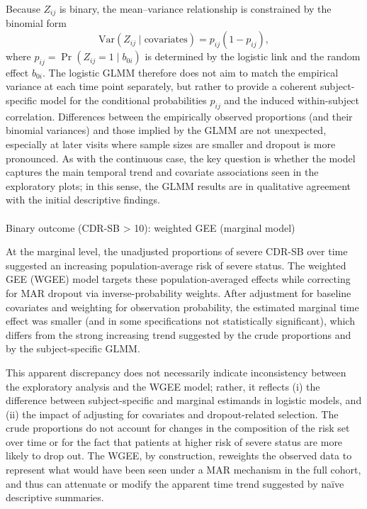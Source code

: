 \documentclass[
  9pt,
  letterpaper,
  DIV=11,
  numbers=noendperiod]{scrartcl}
\makeatletter
\let\oldparagraph\paragraph
\renewcommand{\paragraph}{
    \@ifstar
      \xxxParagraphStar
      \xxxParagraphNoStar
  }
\newcommand{\xxxParagraphStar}[1]{\oldparagraph*{#1}\mbox{}}
\newcommand{\xxxParagraphNoStar}[1]{\oldparagraph{#1}\mbox{}}
\makeatother
\begin{document}
Because \(Z_{ij}\) is binary, the mean--variance relationship is
constrained by the binomial form \[
\mathrm{Var}(Z_{ij} \mid \text{covariates}) = p_{ij}(1-p_{ij}),
\] where \(p_{ij}=\Pr(Z_{ij}=1\mid b_{0i})\) is determined by the
logistic link and the random effect \(b_{0i}\). The logistic GLMM
therefore does not aim to match the empirical variance at each time
point separately, but rather to provide a coherent subject-specific
model for the conditional probabilities \(p_{ij}\) and the induced
within-subject correlation. Differences between the empirically observed
proportions (and their binomial variances) and those implied by the GLMM
are not unexpected, especially at later visits where sample sizes are
smaller and dropout is more pronounced. As with the continuous case, the
key question is whether the model captures the main temporal trend and
covariate associations seen in the exploratory plots; in this sense, the
GLMM results are in qualitative agreement with the initial descriptive
findings.

\paragraph{Binary outcome (CDR-SB \textgreater{} 10): weighted GEE
(marginal
model)}\label{binary-outcome-cdr-sb-10-weighted-gee-marginal-model}

At the marginal level, the unadjusted proportions of severe CDR-SB over
time suggested an increasing population-average risk of severe status.
The weighted GEE (WGEE) model targets these population-averaged effects
while correcting for MAR dropout via inverse-probability weights. After
adjustment for baseline covariates and weighting for observation
probability, the estimated marginal time effect was smaller (and in some
specifications not statistically significant), which differs from the
strong increasing trend suggested by the crude proportions and by the
subject-specific GLMM.

This apparent discrepancy does not necessarily indicate inconsistency
between the exploratory analysis and the WGEE model; rather, it reflects
(i) the difference between subject-specific and marginal estimands in
logistic models, and (ii) the impact of adjusting for covariates and
dropout-related selection. The crude proportions do not account for
changes in the composition of the risk set over time or for the fact
that patients at higher risk of severe status are more likely to drop
out. The WGEE, by construction, reweights the observed data to represent
what would have been seen under a MAR mechanism in the full cohort, and
thus can attenuate or modify the apparent time trend suggested by naïve
descriptive summaries.
\end{document}
